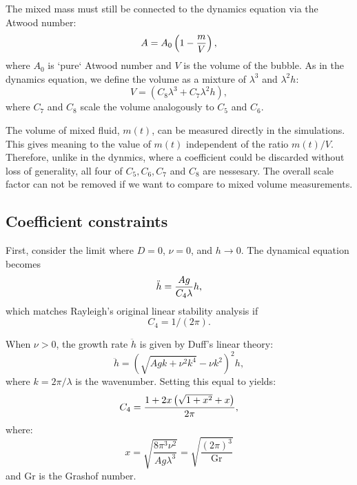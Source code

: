 The mixed mass must still be connected to the dynamics equation via the Atwood number:
\begin{equation} \elabel{effective-atwood}
A = A_0 \left( 1 - \frac{m}{V}\right),
\end{equation}
where $A_0$ is `pure` Atwood number and
$V$ is the volume of the bubble.
As in the dynamics equation, we define the volume as a mixture of $\lambda^3$ and $\lambda^2 h$:
\begin{equation}
V = \left(C_8 \lambda^3 + C_7 \lambda^2 h\right),
\end{equation}
where $C_7$ and $C_8$ scale the volume analogously to $C_5$ and $C_6$.

The volume of mixed fluid, $m(t)$, can be measured directly in the simulations.
This gives meaning to the value of $m(t)$ independent of the ratio $m(t)/V$.
Therefore, unlike in the dynmics, where a coefficient could be discarded without loss of generality, all four of $C_5, C_6, C_7$ and $C_8$ are nessesary.
The overall scale factor can not be removed if we want to compare to mixed volume measurements.

\subsection{Coefficient constraints}
First, consider the limit where $D = 0$, $\nu = 0$, and $h \rightarrow 0$.
The dynamical equation becomes
\begin{equation} \elabel{first_constraint}
\ddot{h} = \frac{A g }{C_4 \lambda} h,
\end{equation}
which matches Rayleigh's original linear stability analysis if 
\begin{equation} 
C_4 = 1/(2 \pi).
\end{equation}

When $\nu > 0$, the growth rate $\ddot{h}$ is given by Duff's linear theory:
\begin{equation}
\ddot{h} = \left(\sqrt{A g k + \nu^2 k^4} - \nu k^2\right)^2 h,
\end{equation}
where $k = 2\pi / \lambda$ is the wavenumber.
Setting this equal to  yields:
\begin{equation} \elabel{c4}
C_4 = \frac{1 + 2x\left(\sqrt{1 + x^2} + x\right)}{2\pi},
\end{equation}
where:
\begin{equation}
x = \sqrt{\frac{8 \pi^3 \nu^2}{A g \lambda^3}} = \sqrt{\frac{(2 \pi)^3}{\text{Gr}}}
\end{equation}
and Gr is the Grashof number.

